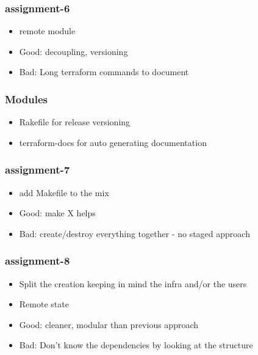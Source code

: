 \documentclass[9pt]{beamer}
\begin{document}
\begin{frame}[fragile]
  \frametitle{assignment-6}

  \begin{itemize}[<+->]
    \item remote module
    \item Good: decoupling, versioning
    \item Bad: Long terraform commands to document
  \end{itemize}

\end{frame}


\begin{frame}[fragile]
  \frametitle{Modules}

  \begin{itemize}[<+->]
    \item Rakefile for release versioning
    \item terraform-docs for auto generating documentation
  \end{itemize}

\end{frame}

\begin{frame}[fragile]
  \frametitle{assignment-7}

  \begin{itemize}[<+->]
    \item add Makefile to the mix
    \item Good: make X helps
    \item Bad: create/destroy everything together - no staged approach
  \end{itemize}

\end{frame}


\begin{frame}[fragile]
  \frametitle{assignment-8}

  \begin{itemize}[<+->]
    \item Split the creation keeping in mind the infra and/or the users
    \item Remote state
    \item Good: cleaner, modular than previous approach
    \item Bad: Don't know the dependencies by looking at the structure
  \end{itemize}

\end{frame}
\end{document}
